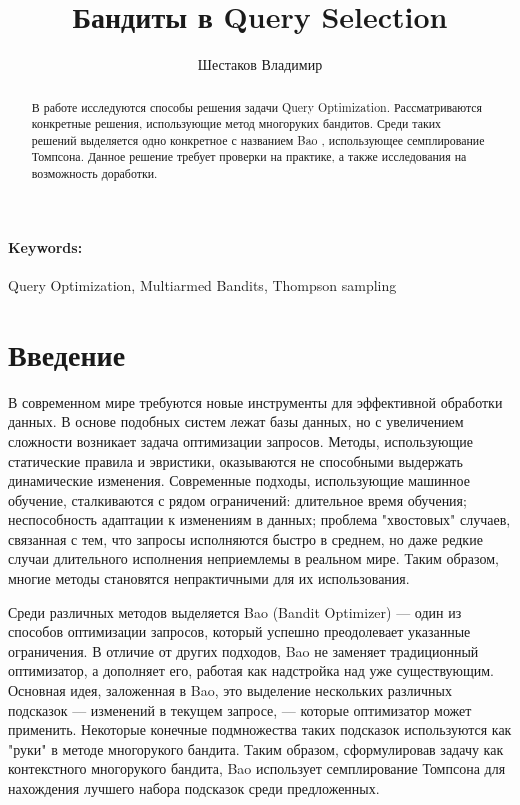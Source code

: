 \documentclass[12pt]{article}
\title{Бандиты в Query Selection}
\author{Шестаков Владимир}
\date{}
\begin{document}
\maketitle

\begin{abstract}
В работе исследуются способы решения задачи Query Optimization. Рассматриваются конкретные решения, использующие метод многоруких бандитов. Среди таких решений выделяется одно конкретное с названием Bao \cite{bao}, использующее семплирование Томпсона. Данное решение требует проверки на практике, а также исследования на возможность доработки.
\end{abstract}
\paragraph{Keywords:} Query Optimization, Multiarmed Bandits, Thompson sampling

\section{Введение}
В современном мире требуются новые инструменты для эффективной обработки данных. В основе подобных систем лежат базы данных, но с увеличением сложности возникает задача оптимизации запросов. Методы, использующие статические правила и эвристики, оказываются не способными выдержать динамические изменения. Современные подходы, использующие машинное обучение, сталкиваются с рядом ограничений: длительное время обучения; неспособность адаптации к изменениям в данных; проблема "хвостовых" случаев, связанная с тем, что запросы исполняются быстро в среднем, но даже редкие случаи длительного исполнения неприемлемы в реальном мире. Таким образом, многие методы становятся непрактичными для их использования.

Среди различных методов выделяется Bao (Bandit Optimizer) \cite{bao} — один из способов оптимизации запросов, который успешно преодолевает указанные ограничения. В отличие от других подходов, Bao не заменяет традиционный оптимизатор, а дополняет его, работая как надстройка над уже существующим. Основная идея, заложенная в Bao, это выделение нескольких различных подсказок — изменений в текущем запросе, — которые оптимизатор может применить. Некоторые конечные подмножества таких подсказок используются как "руки" в методе многорукого бандита. Таким образом, сформулировав задачу как контекстного многорукого бандита, Bao использует семплирование Томпсона для нахождения лучшего набора подсказок среди предложенных.
\end{document}

